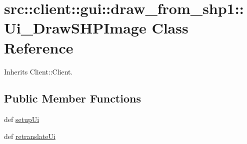 \hypertarget{classsrc_1_1client_1_1gui_1_1draw__from__shp1_1_1Ui__DrawSHPImage}{
\section{src::client::gui::draw\_\-from\_\-shp1::Ui\_\-DrawSHPImage Class Reference}
\label{classsrc_1_1client_1_1gui_1_1draw__from__shp1_1_1Ui__DrawSHPImage}
}


Inherits Client::Client.

\subsection*{Public Member Functions}
\begin{DoxyCompactItemize}
\item 
def \hyperlink{classsrc_1_1client_1_1gui_1_1draw__from__shp1_1_1Ui__DrawSHPImage_a4284ae8e4a479644a9dd552b09689102}{setupUi}
\item 
def \hyperlink{classsrc_1_1client_1_1gui_1_1draw__from__shp1_1_1Ui__DrawSHPImage_ae02de759d5138754f10c2961987a2da3}{retranslateUi}
\end{DoxyCompactItemize}
